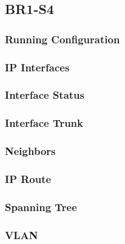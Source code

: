 \subsection{BR1-S4}
\subsubsection{Running Configuration}


\subsubsection{IP Interfaces}


\subsubsection{Interface Status}


\subsubsection{Interface Trunk}


\subsubsection{Neighbors}


\subsubsection{IP Route}


\subsubsection{Spanning Tree}


\subsubsection{VLAN}




